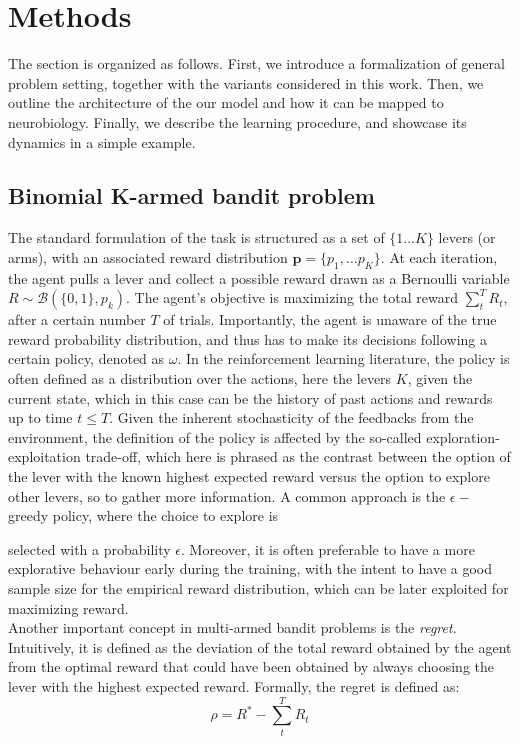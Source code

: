 

\section{Methods}

\noindent The section is organized as follows. First, we introduce a formalization of general problem setting, together with the variants considered in this work. Then, we outline the architecture of the our model and how it can be mapped to neurobiology. Finally, we describe the learning procedure,
and showcase its dynamics in a simple example.

\subsection{Binomial K-armed bandit problem}
\hfill \break
\noindent The standard formulation of the task is structured as a set of $\{1\dots K\}$ levers (or arms), with an associated reward distribution $\mathbf{p}=\{p_{1}, \ldots p_{K}\}$. At each iteration, the agent pulls a lever and collect a possible reward drawn as a Bernoulli variable $R\sim
\mathcal{B}(\{0,1\},p_{k})$. The agent's objective is maximizing the total reward
$\sum^{T}_{t} R_{t}$, after a certain number $T$ of trials.
Importantly, the agent is unaware of the true reward probability distribution, and thus has to make its decisions following a certain policy, denoted as $\omega$. In the reinforcement learning literature, the policy is often defined as
a distribution over the actions, here the levers $K$, given the current state, which in this case can be the history of past actions and rewards up to time $t\leq T$.
Given the inherent stochasticity of the feedbacks from the environment, the definition of the policy is affected by the so-called exploration-exploitation trade-off, which here is phrased as the contrast between the option of the lever with the known highest expected reward versus the option to explore other levers, so to gather more information.
A common approach is the $\epsilon-$greedy policy, where the choice to explore is

selected with a probability $\epsilon$. Moreover, it is often preferable to have a more explorative behaviour early during the training, with the intent to have a good sample size for the empirical reward distribution, which can be later exploited for maximizing reward.\\
Another important concept in multi-armed bandit problems is the \textit{regret}. Intuitively, it is defined as the deviation of the total reward obtained by the agent from the optimal reward that could have been obtained by always choosing the lever with the highest expected reward. Formally, the regret is defined as:
\begin{equation}
    \rho=R^{*} - \sum^{T}_{t} R_{t}
\end{equation}

